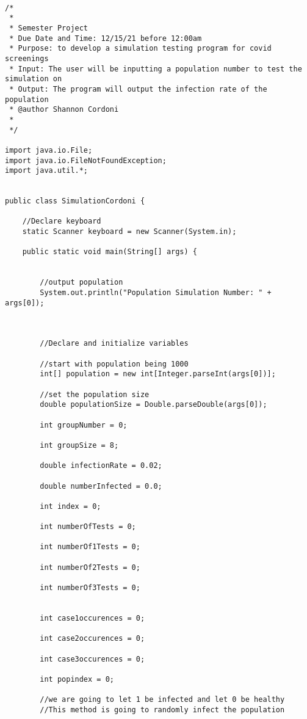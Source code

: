 \documentclass[letterpaper, 10pt,DIV=13]{scrartcl}
\numberwithin{equation}{section} %
\numberwithin{figure}{section} %
\numberwithin{table}{section} %
\begin{document}
\lstset{numbers=left, numberstyle=\tiny, stepnumber=1, numbersep=5pt, basicstyle=\footnotesize\ttfamily}
\begin{lstlisting}[frame=single, ] 

/*
 * 
 * Semester Project
 * Due Date and Time: 12/15/21 before 12:00am 
 * Purpose: to develop a simulation testing program for covid screenings
 * Input: The user will be inputting a population number to test the simulation on
 * Output: The program will output the infection rate of the population
 * @author Shannon Cordoni 
 * 
 */

import java.io.File;
import java.io.FileNotFoundException;
import java.util.*;


public class SimulationCordoni {

    //Declare keyboard 
    static Scanner keyboard = new Scanner(System.in);
    
    public static void main(String[] args) {

        
        //output population
        System.out.println("Population Simulation Number: " + args[0]);



        //Declare and initialize variables 
       
        //start with population being 1000
        int[] population = new int[Integer.parseInt(args[0])];

        //set the population size
        double populationSize = Double.parseDouble(args[0]);

        int groupNumber = 0;

        int groupSize = 8;
        
        double infectionRate = 0.02;

        double numberInfected = 0.0;

        int index = 0;

        int numberOfTests = 0;

        int numberOf1Tests = 0;

        int numberOf2Tests = 0;

        int numberOf3Tests = 0;


        int case1occurences = 0;

        int case2occurences = 0;

        int case3occurences = 0;

        int popindex = 0;

        //we are going to let 1 be infected and let 0 be healthy
        //This method is going to randomly infect the population


\end{lstlisting}
\end{document}
